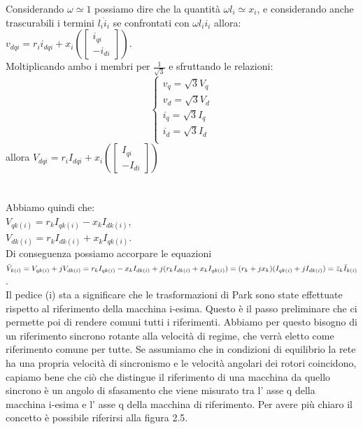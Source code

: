 \documentclass[Lau,noexaminfo]{sapthesis}
\begin{document}
	Considerando $\omega \simeq 1$ possiamo dire che la quantità $\omega l_i \simeq x_i$, e considerando anche trascurabili i termini $l_i\dot{i}_i$ se confrontati con $\omega l_ii_i$ allora:\\
	$v_{dqi}=r_ii_{dqi}+x_i(\begin{bmatrix}
	i_{qi}\\
	-i_{di}
	\end{bmatrix})$.\\ 
	Moltiplicando ambo i membri per $\frac{1}{\sqrt{3}}$ e sfruttando le relazioni:\\
	\[
	\begin{cases}
	v_q=\sqrt{3}V_q\\
	v_d=\sqrt{3}V_d\\
	i_q=\sqrt{3}I_q\\
	i_d=\sqrt{3}I_d\\
	\end{cases}
	\]
	allora $V_{dqi}=r_iI_{dqi}+x_i(\begin{bmatrix}
	I_{qi}\\
	-I_{di}
	\end{bmatrix})$\\\\\\
	Abbiamo quindi che:\\
	$V_{qk(i)}=r_kI_{qk(i)}-x_kI_{dk(i)}$,\\
	$V_{dk(i)}=r_kI_{dk(i)}+x_kI_{qk(i)}$.\\
	Di conseguenza possiamo accorpare le equazioni \\
	$\bar{V}_{k(i)}=V_{qk(i)}+jV_{dk(i)}=r_kI_{qk(i)}-x_kI_{dk(i)}+j(r_kI_{dk(i)}+x_kI_{qk(i)})=\\
	(r_k+jx_k)(I_{qk(i)}+jI_{dk(i)})=\bar{z}_k\bar{I}_{k(i)}$.\\
	Il pedice (i) sta a significare che le trasformazioni di Park sono state effettuate rispetto al riferimento della macchina i-esima. Questo è il passo preliminare che ci permette poi di rendere comuni tutti i riferimenti. Abbiamo per questo bisogno di un riferimento sincrono rotante alla velocità di regime, che verrà eletto come riferimento comune per tutte. Se assumiamo che in condizioni di equilibrio la rete ha una propria velocità di sincronismo e le velocità angolari dei rotori coincidono, capiamo bene che ciò che distingue il riferimento di una macchina da quello sincrono è un angolo di sfasamento che viene misurato tra l' asse q della macchina i-esima e l' asse q della macchina di riferimento. Per avere più chiaro il concetto è possibile riferirsi alla figura 2.5.
\end{document}
